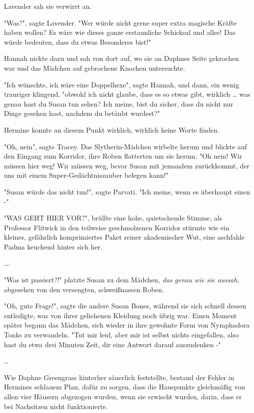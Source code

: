 {Lavender sah sie verwirrt an.

"Was?", sagte Lavender. "Wer würde nicht gerne super extra magische Kräfte haben wollen? Es wäre wie dieses ganze erstaunliche Schicksal und alles! Das würde bedeuten, dass du etwas Besonderes bist!"

Hannah nickte dazu und sah von dort auf, wo sie an Daphnes Seite gekrochen war und das Mädchen auf gebrochene Knochen untersuchte.

"Ich wünschte, ich wäre eine Doppelhexe", sagte Hannah, und dann, ein wenig trauriger klingend, "obwohl ich nicht glaube, dass es so etwas gibt, wirklich … was genau hast du Susan tun sehen? Ich meine, bist du sicher, dass du nicht nur Dinge gesehen hast, nachdem du betäubt wurdest?"

Hermine konnte an diesem Punkt wirklich, wirklich keine Worte finden.

"Oh, nein", sagte Tracey. Das Slytherin-Mädchen wirbelte herum und blickte auf den Eingang zum Korridor, ihre Roben flatterten um sie herum. "Oh nein! Wir müssen hier weg! Wir müssen weg, bevor Susan mit jemandem zurückkommt, der uns mit einem Super-Gedächtniszauber belegen kann!"

"Susan würde das nicht tun!", sagte Parvati. "Ich meine, wenn es überhaupt einen -"

"WAS GEHT HIER VOR?", brüllte eine hohe, quietschende Stimme, als Professor Flitwick in den teilweise geschmolzenen Korridor stürmte wie ein kleines, gefährlich komprimiertes Paket reiner akademischer Wut, eine aschfahle Padma keuchend hinter sich her.

….

"Was ist passiert?!" platzte Susan zu dem Mädchen, \emph{das genau wie sie aussah}, abgesehen von den versengten, schweißnassen Roben.

"Oh, gute Frage!", sagte die andere Susan Bones, während sie sich schnell dessen entledigte, was von ihrer geliehenen Kleidung noch übrig war. Einen Moment später begann das Mädchen, sich wieder in ihre gewohnte Form von Nymphadora Tonks zu verwandeln. "Tut mir leid, aber mir ist selbst nichts eingefallen, also hast du etwa drei Minuten Zeit, dir eine Antwort darauf auszudenken -"

…

Wie Daphne Greengrass hinterher säuerlich feststellte, bestand der Fehler in Hermines schlauem Plan, dafür zu sorgen, dass die Hauspunkte gleichmäßig von allen vier Häusern abgezogen wurden, wenn sie erwischt wurden, darin, dass er bei Nachsitzen nicht funktionierte.

}
